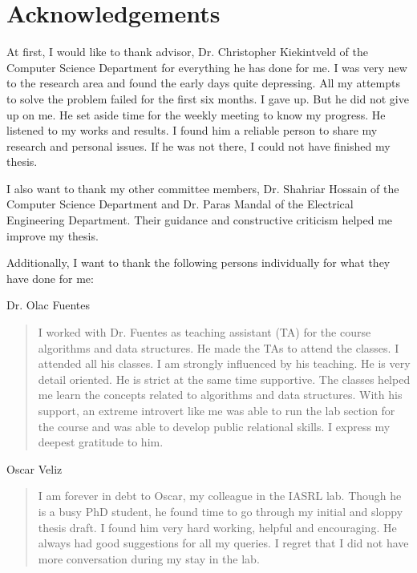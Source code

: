 

\chapter*{Acknowledgements}

At first, I would like to thank advisor, Dr. Christopher Kiekintveld of the Computer Science Department for everything he has done for me. I was very new to the research area and found the early days quite depressing. All my attempts to solve the problem failed for the first six months. I gave up. But he did not give up on me. He set aside time for the weekly meeting to know my progress. He listened to my works and results. I found him a reliable person to share my research and personal issues. If he was not there, I could not have finished my thesis. 

I also want to thank my other committee members, Dr. Shahriar Hossain of 
the Computer Science Department and Dr. Paras Mandal of the Electrical Engineering Department. Their guidance and constructive criticism helped me improve my thesis.

Additionally, I want to thank the following persons individually for what they have done for me:

\bigskip

\noindent
Dr. Olac Fuentes
\begin{quote}
 I worked with Dr. Fuentes as teaching assistant (TA) for the course algorithms and data structures. He made the TAs to attend the classes. I attended all his classes. I am strongly influenced by his teaching. He is very detail oriented. He is strict at the same time supportive. The classes helped me learn the concepts related to algorithms and data structures. With his support, an extreme introvert like me was able to run the lab section for the course and was able to develop public relational skills. I express my deepest gratitude to him.
\end{quote}

\noindent
Oscar Veliz
\begin{quote}
  I am forever in debt to Oscar, my colleague in the IASRL lab. Though he is a busy PhD student, he found time to go through my initial and sloppy thesis draft. I found him very hard working, helpful and encouraging. He always had good suggestions for all my queries. I regret that I did not have more conversation during my stay in the lab.
\end{quote}

